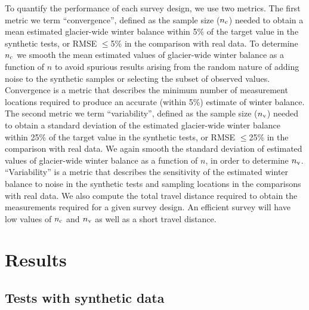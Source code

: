 \documentclass[twocolumn,letterpaper]{igs}
\begin{document}
To quantify the performance of each survey design, we use two metrics. The first metric we term ``convergence'', defined as the sample size ($n_{\rm c}$) needed to obtain a mean estimated glacier-wide winter balance within 5\% of the target value in the synthetic tests, or RMSE $\leq$5\% in the comparison with real data. To determine $n_{\rm c}$ we smooth the mean estimated values of glacier-wide winter balance as a function of $n$ to avoid spurious results arising from the random nature of adding noise to the synthetic samples or selecting the subset of observed values.
Convergence is a metric that describes the minimum number of measurement locations required to produce an accurate (within 5\%) estimate of winter balance. The second metric we term ``variability'', defined as the sample size ($n_{\rm v}$) needed to obtain a standard deviation of the estimated glacier-wide winter balance within 25\% of the target value in the synthetic tests, or RMSE $\leq$25\% in the comparison with real data. We again smooth the standard deviation of estimated values of glacier-wide winter balance as a function of $n$, in order to determine $n_{\rm v}$. 
``Variability'' is a metric that describes the sensitivity of the estimated winter balance to noise in the synthetic tests and sampling locations in the comparisons with real data.
We also compute the total travel distance required to obtain the measurements required for a given survey design. An efficient survey will have low values of  $n_{\rm c}$ and $n_{\rm v}$ as well as a short travel distance. 

\section{Results }

\subsection{Tests with synthetic data}
\end{document}
